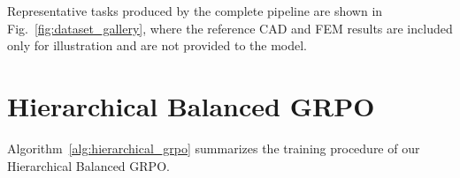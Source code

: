 Representative tasks produced by the complete pipeline are shown in
Fig.~\ref{fig:dataset_gallery}, where the reference CAD and FEM results are
included only for illustration and are not provided to the model.





\section{Hierarchical Balanced GRPO}
\label{app:hierarchical_grpo}

Algorithm~\ref{alg:hierarchical_grpo} summarizes the training procedure of our
Hierarchical Balanced GRPO. 

